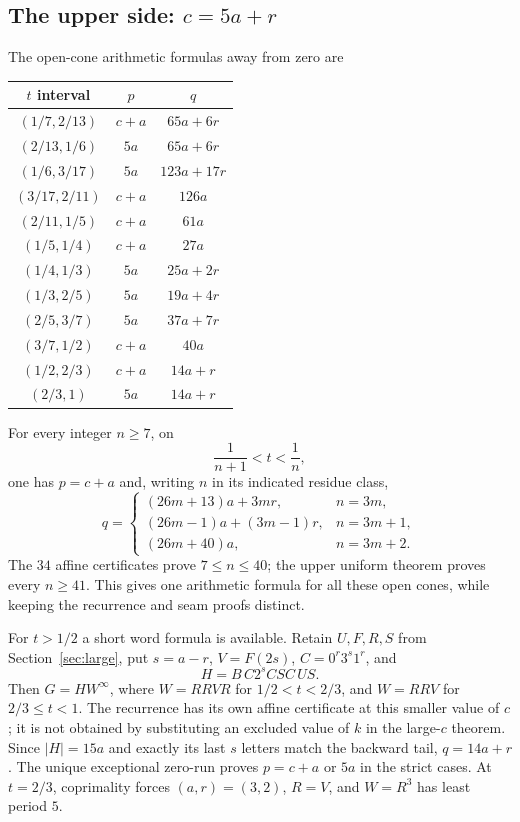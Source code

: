 \documentclass[11pt]{article}
\theoremstyle{remark}\newtheorem{remark}[theorem]{Remark}
\newcommand{\per}{^{\infty}}
\begin{document}
\subsection{The upper side: \texorpdfstring{$c=5a+r$}{c=5a+r}}
The open-cone arithmetic formulas away from zero are
\begin{center}\small
\begin{tabular}{c|c|c}\toprule
$t$ interval & $p$ & $q$\\\midrule
$(1/7,2/13)$ & $c+a$ & $65a+6r$\\
$(2/13,1/6)$ & $5a$ & $65a+6r$\\
$(1/6,3/17)$ & $5a$ & $123a+17r$\\
$(3/17,2/11)$ & $c+a$ & $126a$\\
$(2/11,1/5)$ & $c+a$ & $61a$\\
$(1/5,1/4)$ & $c+a$ & $27a$\\
$(1/4,1/3)$ & $5a$ & $25a+2r$\\
$(1/3,2/5)$ & $5a$ & $19a+4r$\\
$(2/5,3/7)$ & $5a$ & $37a+7r$\\
$(3/7,1/2)$ & $c+a$ & $40a$\\
$(1/2,2/3)$ & $c+a$ & $14a+r$\\
$(2/3,1)$ & $5a$ & $14a+r$\\\bottomrule
\end{tabular}
\end{center}
For every integer $n\ge7$, on
\[
\frac1{n+1}<t<\frac1n,
\]
one has $p=c+a$ and, writing $n$ in its indicated residue class,
\[
q=\begin{cases}
(26m+13)a+3mr,&n=3m,\\
(26m-1)a+(3m-1)r,&n=3m+1,\\
(26m+40)a,&n=3m+2.
\end{cases}
\]
The $34$ affine certificates prove $7\le n\le40$; the upper uniform theorem proves every $n\ge41$. This gives one arithmetic formula for all these open cones, while keeping the recurrence and seam proofs distinct.

For $t>1/2$ a short word formula is available. Retain $U,F,R,S$ from Section~\ref{sec:large}, put $s=a-r$, $V=F(2s)$, $C=0^r3^s1^r$, and
\[
H=B\,C2^sCSC\,US.
\]
Then $G=HW\per$, where $W=RRVR$ for $1/2<t<2/3$, and $W=RRV$ for $2/3\le t<1$. The recurrence has its own affine certificate at this smaller value of $c$; it is not obtained by substituting an excluded value of $k$ in the large-$c$ theorem. Since $|H|=15a$ and exactly its last $s$ letters match the backward tail, $q=14a+r$. The unique exceptional zero-run proves $p=c+a$ or $5a$ in the strict cases. At $t=2/3$, coprimality forces $(a,r)=(3,2)$, $R=V$, and $W=R^3$ has least period $5$.
\end{document}
